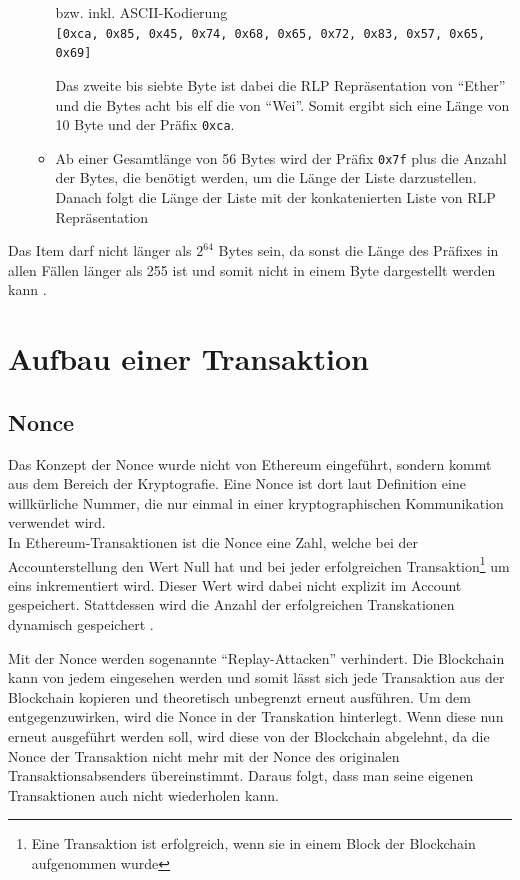 \documentclass[runningheads]{llncs}
\begin{document}
\begin{enumerate}
\begin{itemize}
\begin{center}
                  bzw. inkl. ASCII-Kodierung\\
                  \texttt{[0xca, 0x85, 0x45, 0x74, 0x68, 0x65, 0x72, 0x83, 0x57, 0x65, 0x69]}
                \end{center}
                Das zweite bis siebte Byte ist dabei die RLP Repräsentation von "`Ether"' und die Bytes acht bis elf die von "`Wei"'. Somit ergibt sich eine Länge von 10 Byte und der Präfix \verb+0xca+.
          \item Ab einer Gesamtlänge von 56 Bytes wird der Präfix \texttt{0x7f} plus die Anzahl der Bytes, die benötigt werden, um die Länge der Liste darzustellen. Danach folgt die Länge der Liste mit der konkatenierten Liste von RLP Repräsentation
        \end{itemize}
\end{enumerate}
Das Item darf nicht länger als $2^{64}$ Bytes sein, da sonst die Länge des Präfixes in allen Fällen länger als 255 ist und somit nicht in einem Byte dargestellt werden kann \cite[S.18,19]{wood_ethereum/yellowpaper_2019}.
\section{Aufbau einer Transaktion}

\subsection{Nonce}
\label{nonce}
Das Konzept der Nonce wurde nicht von Ethereum eingeführt, sondern kommt aus dem Bereich der Kryptografie. Eine Nonce ist dort laut Definition \cite{noauthor_ethereum/wiki/rlp_nodate}
eine willkürliche Nummer, die nur einmal in einer kryptographischen Kommunikation verwendet wird.\\
In Ethereum-Transaktionen ist die Nonce eine Zahl, welche bei der Accounterstellung den Wert Null hat und bei jeder erfolgreichen Transaktion\footnote{Eine Transaktion ist erfolgreich, wenn sie in einem Block der Blockchain aufgenommen wurde} um eins inkrementiert wird. Dieser Wert wird dabei nicht explizit im Account gespeichert. Stattdessen wird die Anzahl der erfolgreichen Transkationen dynamisch gespeichert \cite[S.101]{antonopoulos_mastering_2019}.

Mit der Nonce werden sogenannte "`Replay-Attacken"' verhindert. Die Blockchain kann von jedem eingesehen werden und somit lässt sich jede Transaktion aus der Blockchain kopieren und theoretisch unbegrenzt erneut ausführen. Um dem entgegenzuwirken, wird die Nonce in der Transkation hinterlegt. Wenn diese nun erneut ausgeführt werden soll, wird diese von der Blockchain abgelehnt, da die Nonce der Transaktion nicht mehr mit der Nonce des originalen Transaktionsabsenders übereinstimmt. Daraus folgt, dass man seine eigenen Transaktionen auch nicht wiederholen kann.
\end{document}
